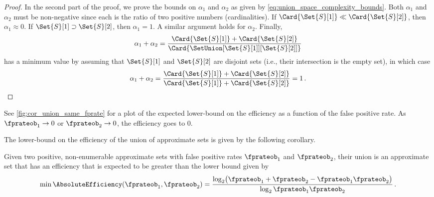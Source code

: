 \documentclass[ ../main.tex]{subfiles}
\begin{document}
\begin{proof}
In the second part of the proof, we prove the bounds on $\alpha_1$ and $\alpha_2$ as given by \cref{eq:union_space_complexity_bounds}.
Both $\alpha_1$ and $\alpha_2$ must be non-negative since each is the ratio of two positive numbers (cardinalities). If $\Card{\Set{S}[1]} \ll \Card{\Set{S}[2]}$, then $\alpha_1 \approx 0$. If $\Set{S}[1] \supset \Set{S}[2]$, then $\alpha_1 = 1$. A similar argument holds for $\alpha_2$. Finally,
\begin{equation}
    \alpha_1 + \alpha_2 = \frac{\Card{\Set{S}[1]} + \Card{\Set{S}[2]}}{\Card{\SetUnion[\Set{S}[1]][\Set{S}[2]]}}
\end{equation}
has a minimum value by assuming that $\Set{S}[1]$ and $\Set{S}[2]$ are disjoint sets (i.e., their intersection is the empty set), in which case
\begin{equation}
    \alpha_1 + \alpha_2 = \frac{\Card{\Set{S}[1]} + \Card{\Set{S}[2]}}{\Card{\Set{S}[1]} + \Card{\Set{S}[2]}} = 1\,.
\end{equation}
\end{proof}
See \cref{fig:cor_union_same_fprate} for a plot of the expected lower-bound on the efficiency as a function of the false positive rate. As $\fprateob_1 \to 0$ or $\fprateob_2 \to 0$, the efficiency goes to $0$.

The lower-bound on the efficiency of the union of approximate sets is given by the following corollary.
\begin{corollary}
Given two positive, non-enumerable approximate sets with false positive rates $\fprateob_1$ and $\fprateob_2$, their union is an approximate set that has an efficiency that is expected to be greater than the lower bound given by
\begin{equation}
    \min \AbsoluteEfficiency(\fprateob_1, \fprateob_2) = \frac{
        \log_2\!\left(\fprateob_1 + \fprateob_2 - \fprateob_1 \fprateob_2\right)}
    {
        \log_2 \fprateob_1 \fprateob_2
    }\,.
\end{equation}
\end{corollary}
\end{document}
